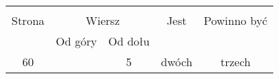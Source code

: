 \documentclass[a4paper,11pt]{article}
\numberwithin{equation}{section}
\begin{document}


\begin{center}

  \begin{tabular}{|c|c|c|c|c|}
    \hline
    & \multicolumn{2}{c|}{} & & \\
    Strona & \multicolumn{2}{c|}{Wiersz} & Jest
                              & Powinno być \\ \cline{2-3}
    & Od góry & Od dołu & & \\
    \hline
    60 & & 5 & dwóch & trzech \\
    \hline
  \end{tabular}

\end{center}

\VerSpaceTwo





















\printbibliography





\end{document}
